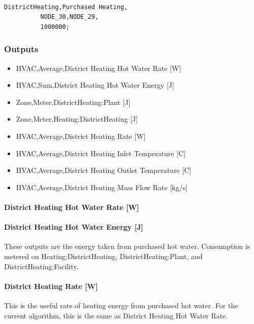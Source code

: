 \begin{lstlisting}

DistrictHeating,Purchased Heating,
          NODE_30,NODE_29,
          1000000;
\end{lstlisting}

\subsubsection{Outputs}\label{outputs-15-002}

\begin{itemize}
\item
  HVAC,Average,District Heating Hot Water Rate {[}W{]}
\item
  HVAC,Sum,District Heating Hot Water Energy {[}J{]}
\item
  Zone,Meter,DistrictHeating:Plant {[}J{]}
\item
  Zone,Meter,Heating:DistrictHeating {[}J{]}
\item
  HVAC,Average,District Heating Rate {[}W{]}
\item
  HVAC,Average,District Heating Inlet Temperature {[}C{]}
\item
  HVAC,Average,District Heating Outlet Temperature {[}C{]}
\item
  HVAC,Average,District Heating Mass Flow Rate {[}kg/s{]}
\end{itemize}

\paragraph{District Heating Hot Water Rate {[}W{]}}\label{district-heating-hot-water-rate-w}

\paragraph{District Heating Hot Water Energy {[}J{]}}\label{district-heating-hot-water-energy-j}

These outputs are the energy taken from purchased hot water. Consumption is metered on Heating:DistrictHeating, DistrictHeating:Plant, and DistrictHeating:Facility.

\paragraph{District Heating Rate {[}W{]}}\label{district-heating-rate-w}

This is the useful rate of heating energy from purchased hot water. For the current algorithm, this is the same as District Heating Hot Water Rate.

